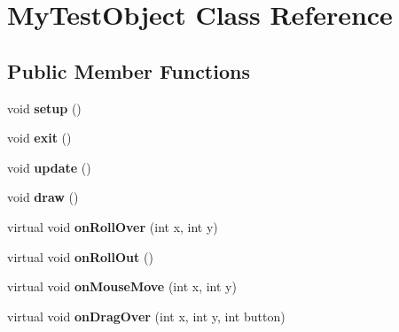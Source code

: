\hypertarget{class_my_test_object}{
\section{MyTestObject Class Reference}
\label{class_my_test_object}
}
\subsection*{Public Member Functions}
\begin{DoxyCompactItemize}
\item 
\hypertarget{class_my_test_object_ad1f19e9ab21fd855f426509f0e788385}{
void {\bfseries setup} ()}
\label{class_my_test_object_ad1f19e9ab21fd855f426509f0e788385}

\item 
\hypertarget{class_my_test_object_a19cb98ca55c1002ee360e761bdfe2f73}{
void {\bfseries exit} ()}
\label{class_my_test_object_a19cb98ca55c1002ee360e761bdfe2f73}

\item 
\hypertarget{class_my_test_object_af556eba7f99902bf199a70f4fa1003da}{
void {\bfseries update} ()}
\label{class_my_test_object_af556eba7f99902bf199a70f4fa1003da}

\item 
\hypertarget{class_my_test_object_a0da75c5b981da05a09b3459de6a8ed43}{
void {\bfseries draw} ()}
\label{class_my_test_object_a0da75c5b981da05a09b3459de6a8ed43}

\item 
\hypertarget{class_my_test_object_afc90c2cf8e519ab74a27a71657261d13}{
virtual void {\bfseries onRollOver} (int x, int y)}
\label{class_my_test_object_afc90c2cf8e519ab74a27a71657261d13}

\item 
\hypertarget{class_my_test_object_ad1b505d3aa2681adf52c6611c76bf86f}{
virtual void {\bfseries onRollOut} ()}
\label{class_my_test_object_ad1b505d3aa2681adf52c6611c76bf86f}

\item 
\hypertarget{class_my_test_object_a4bb34407bb474918e389dfefdb018857}{
virtual void {\bfseries onMouseMove} (int x, int y)}
\label{class_my_test_object_a4bb34407bb474918e389dfefdb018857}

\item 
\hypertarget{class_my_test_object_ab529a04c8604936d47c6ff9d3906fefd}{
virtual void {\bfseries onDragOver} (int x, int y, int button)}
\label{class_my_test_object_ab529a04c8604936d47c6ff9d3906fefd}


\end{DoxyCompactItemize}
